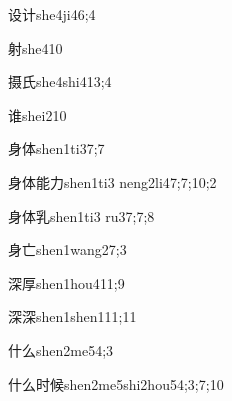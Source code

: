 \begin{verbete}{设计}{she4ji4}{6;4}
\end{verbete}

\begin{verbete}{射}{she4}{10}
\end{verbete}

\begin{verbete}{摄氏}{she4shi4}{13;4}
\end{verbete}

\begin{verbete}{谁}{shei2}{10}
\end{verbete}

\begin{verbete}{身体}{shen1ti3}{7;7}
\end{verbete}

\begin{verbete}{身体能力}{shen1ti3 neng2li4}{7;7;10;2}
\end{verbete}

\begin{verbete}{身体乳}{shen1ti3 ru3}{7;7;8}
\end{verbete}

\begin{verbete}{身亡}{shen1wang2}{7;3}
\end{verbete}

\begin{verbete}{深厚}{shen1hou4}{11;9}
\end{verbete}

\begin{verbete}{深深}{shen1shen1}{11;11}
\end{verbete}

\begin{verbete}{什么}{shen2me5}{4;3}
\end{verbete}

\begin{verbete}{什么时候}{shen2me5shi2hou5}{4;3;7;10}
\end{verbete}

